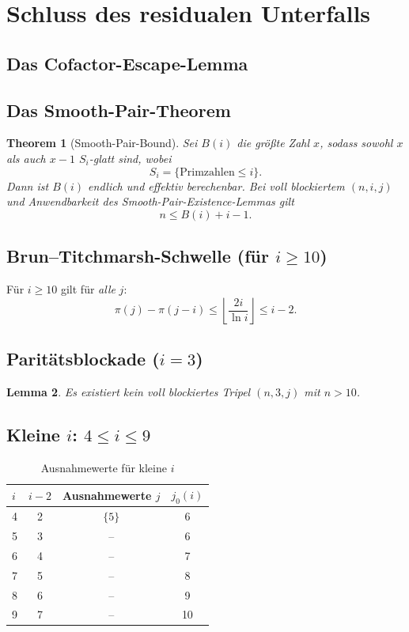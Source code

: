 \documentclass[12pt,a4paper]{article}
\theoremstyle{plain}
\newtheorem{theorem}{Theorem}[section]
\newtheorem{lemma}[theorem]{Lemma}
\theoremstyle{definition}
\theoremstyle{remark}
\begin{document}
	\section{Schluss des residualen Unterfalls}
	
	\subsection{Das Cofactor-Escape-Lemma}
	
	\subsection{Das Smooth-Pair-Theorem}
	
	\begin{theorem}[Smooth-Pair-Bound]
		Sei $B(i)$ die größte Zahl $x$, sodass sowohl $x$ als auch $x-1$ $S_i$-glatt sind, wobei
		\[
		S_i = \{\text{Primzahlen} \leq i\}.
		\]
		Dann ist $B(i)$ endlich und effektiv berechenbar. Bei voll blockiertem $(n,i,j)$ und Anwendbarkeit des Smooth-Pair-Existence-Lemmas gilt
		\[
		n \leq B(i) + i - 1.
		\]
	\end{theorem}
	
	\subsection{Brun--Titchmarsh-Schwelle (für $i \geq 10$)}
	
	Für $i \geq 10$ gilt für \emph{alle} $j$:
	\[
	\pi(j) - \pi(j-i)
	\leq
	\left\lfloor \frac{2i}{\ln i} \right\rfloor
	\leq
	i-2.
	\]
	
	\subsection{Paritätsblockade ($i=3$)}
	
	\begin{lemma}
		Es existiert kein voll blockiertes Tripel $(n,3,j)$ mit $n > 10$.
	\end{lemma}
	
	\subsection{Kleine $i$: $4 \leq i \leq 9$}
	
	\begin{table}[ht]
		\centering
		\begin{tabular}{lccc}
			\toprule
			$i$ & $i-2$ & Ausnahmewerte $j$ & $j_0(i)$ \\
			\midrule
			4 & 2 & $\{5\}$ & 6 \\
			5 & 3 & -- & 6 \\
			6 & 4 & -- & 7 \\
			7 & 5 & -- & 8 \\
			8 & 6 & -- & 9 \\
			9 & 7 & -- & 10 \\
			\bottomrule
		\end{tabular}
		\caption{Ausnahmewerte für kleine $i$}
	\end{table}
	
\end{document}
